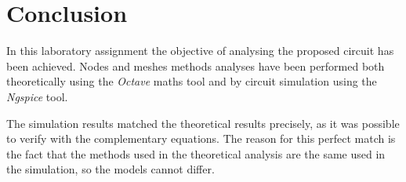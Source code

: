 \section{Conclusion}
\label{sec:conclusion}

In this laboratory assignment the objective of analysing the proposed circuit has been
achieved. Nodes and meshes methods analyses have been performed both
theoretically using the \textit{Octave} maths tool and by circuit simulation using the
\textit{Ngspice} tool.


The simulation results matched the theoretical results
precisely, as it was possible to verify with the complementary equations. The reason for this perfect match is the fact that the methods used in the theoretical analysis are the same used in the simulation, so the models cannot differ. 


